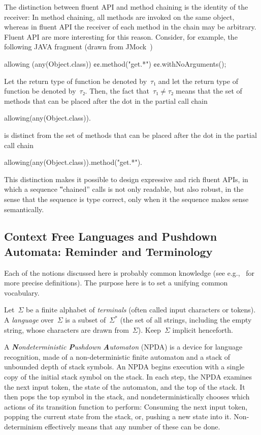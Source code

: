 The distinction between fluent API and method chaining is the identity of the receiver:
In method chaining, all methods are invoked on the same object, whereas in fluent API
  the receiver of each method in the chain may be arbitrary.
Fluent API are more interesting for this reason.
Consider, for example, the following JAVA fragment (drawn from JMock~\cite{Freeman:Pryce:06})
\begin{JAVA}
allowing (any(Object.class))
  ¢¢.method("get.*")
  ¢¢.withNoArguments();
\end{JAVA}
Let the return type of function  be denoted by~$τ₁$ and let the
  return type of function  be denoted by~$τ₂$.
Then, the fact that~$τ₁≠τ₂$ means that the set of methods that can be placed after the dot
  in the partial call chain
\begin{JAVA}
allowing(any(Object.class)).
\end{JAVA}
is distinct from the set of methods that can be placed after the dot in the partial call chain
\begin{JAVA}
allowing(any(Object.class)).method("get.*").
\end{JAVA}
This distinction makes it possible to design expressive and rich fluent APIs, in which a
  sequence ‟chained” calls is not only readable, but also robust, in the sense that the
  sequence is type correct, only when it the sequence makes sense semantically.

\subsection{Context Free Languages and Pushdown Automata: Reminder and Terminology}
Each of the notions discussed here is probably common knowledge
 (see e.g.,~\cite{Hopcroft:book:2001,Linz:2001} for more precise definitions).
The purpose here is to set a unifying common vocabulary.

Let~$Σ$ be a finite alphabet of \emph{terminals} (often called input characters or tokens).
A \emph{language} over~$Σ$
  is a subset of~$Σ^*$ (the set of all strings, including the empty string,
  whose characters are drawn from~$Σ$).
Keep~$Σ$ implicit henceforth.

A \emph{\textbf Nondeterministic \textbf Pushdown \textbf Automaton} (NPDA) is a device for language recognition,
  made of a non-deterministic finite automaton
  and a stack of unbounded depth of stack symbols.
An NPDA begins execution with a single copy of the initial stack symbol on the stack.
In each step, the NPDA
  examines the next input token,
  the state of the automaton,
  and the top of the stack.
It then pops the top symbol in the stack, and nondeterministically chooses which actions of
  its transition function to perform:
  Consuming the next input token,
popping the current state from the stack,
  or, pushing a new state into it.
Non-determinism effectively means
  that any number of these can be done.

